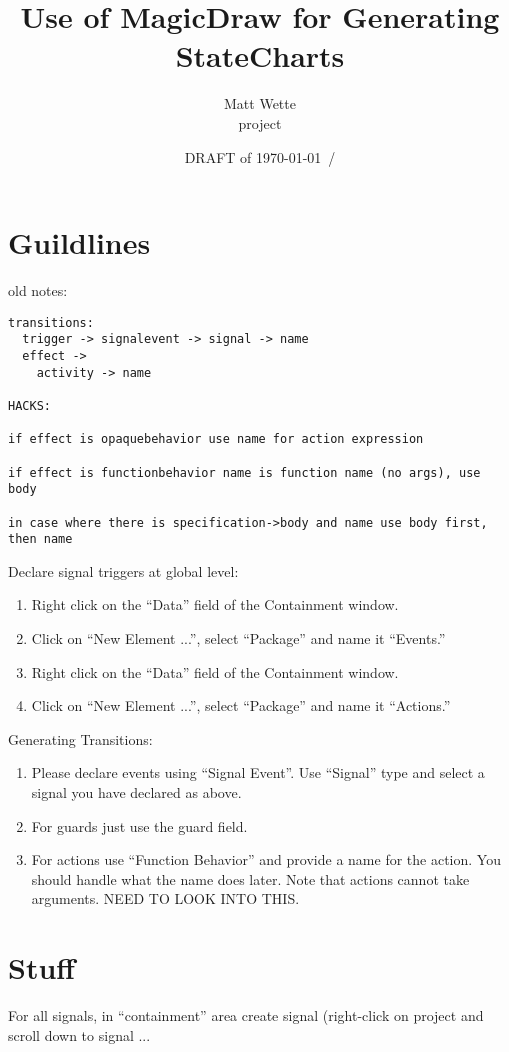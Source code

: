 \documentclass{article}
\title{%
Use of MagicDraw for Generating StateCharts
}
\author{Matt Wette \\ project }
\date{\large DRAFT of \noindent\today \ /\the\time}
\begin{document}
\maketitle

\section{Guildlines}

old notes:
\begin{verbatim}
transitions:
  trigger -> signalevent -> signal -> name
  effect ->
    activity -> name

HACKS:

if effect is opaquebehavior use name for action expression

if effect is functionbehavior name is function name (no args), use body

in case where there is specification->body and name use body first, then name
\end{verbatim}

Declare signal triggers at global level:
\begin{enumerate}
\item
Right click on the ``Data'' field of the Containment window.
\item
Click on ``New Element ...'', select ``Package'' and name it ``Events.''
\item
Right click on the ``Data'' field of the Containment window.
\item
Click on ``New Element ...'', select ``Package'' and name it ``Actions.''
\end{enumerate}

Generating Transitions:
\begin{enumerate}
\item
Please declare events using ``Signal Event''.  Use ``Signal'' type
and select a signal you have declared as above.
\item
For guards just use the guard field.
\item 
For actions use ``Function Behavior'' and provide a name for the action.
You should handle what the name does later.   Note that actions cannot
take arguments.  NEED TO LOOK INTO THIS.
\end{enumerate}

\section{Stuff}

For all signals, in ``containment'' area create signal (right-click on
project and scroll down to signal ...
\end{document}

